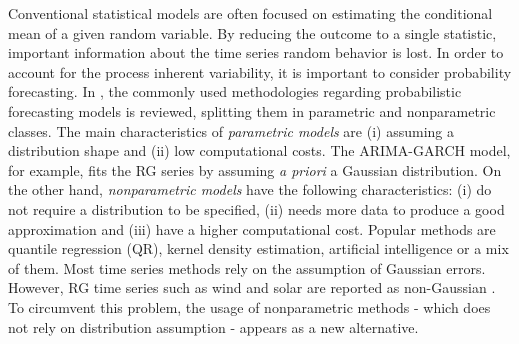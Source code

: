 
Conventional statistical models are often focused on estimating the conditional mean of a given random variable. %
By reducing the outcome to a single statistic, important information about the time series random behavior is lost. In order to account for the process inherent variability, it is important to consider probability forecasting.
In \cite{zhang_review_2014}, the commonly used methodologies regarding probabilistic forecasting models is reviewed, splitting them in parametric and nonparametric classes. The main characteristics of \emph{parametric models} are (i) assuming a distribution shape and (ii) low computational costs. The ARIMA-GARCH model, for example, fits the RG series by assuming \emph{a priori} a Gaussian distribution. On the other hand, \emph{nonparametric models} have the following characteristics: (i) do not require a distribution to be specified, (ii) needs more data to produce a good approximation and (iii) have a higher computational cost. Popular methods are quantile regression (QR), kernel density estimation,  artificial intelligence or a mix of them.
Most time series methods rely on the assumption of Gaussian errors. However, RG time series such as wind and solar are reported as non-Gaussian \cite{bessa2012time,jeon2012using,taylor2015forecasting,Wan2017}. To circumvent this problem, the usage of nonparametric methods - which does not rely on distribution assumption - appears as a new alternative. 

